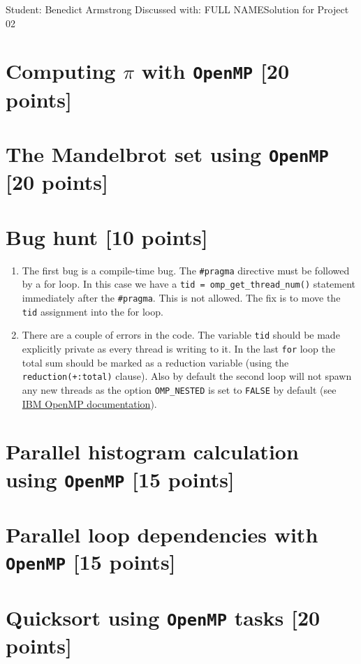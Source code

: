 \documentclass[unicode,11pt,a4paper,oneside,numbers=endperiod,openany]{scrartcl}
\begin{document}
\setassignment
{}

{Student: Benedict Armstrong}
{Discussed with: FULL NAME}{Solution for Project 02}{}
\newline

\assignmentpolicy

\section{Computing $\pi$ with \texttt{OpenMP} [20 points]}

\section{The Mandelbrot set  using \texttt{OpenMP} [20 points]}

\section{Bug hunt [10 points]}

\begin{enumerate}
    \item The first bug is a compile-time bug. The \texttt{\#pragma} directive must be followed by a for loop. In this case we have a \texttt{tid = omp\_get\_thread\_num()} statement immediately after the \texttt{\#pragma}. This is not allowed. The fix is to move the \texttt{tid} assignment into the for loop.
    \item There are a couple of errors in the code. The variable \texttt{tid} should be made explicitly private as every thread is writing to it. In the last \texttt{for} loop the total sum should be marked as a reduction variable (using the \texttt{reduction(+:total)} clause). Also by default the second loop will not spawn any new threads as the option \texttt{OMP\_NESTED} is set to \texttt{FALSE} by default (see \href{https://www.ibm.com/docs/en/xl-c-aix/13.1.2?topic=openmp-omp-nested}{IBM OpenMP documentation}).

\end{enumerate}

\section{Parallel histogram calculation using \texttt{OpenMP} [15 points]}

\section{Parallel loop dependencies with \texttt{OpenMP} [15 points]}

\section{Quicksort using \texttt{OpenMP} tasks [20 points]}
\end{document}
